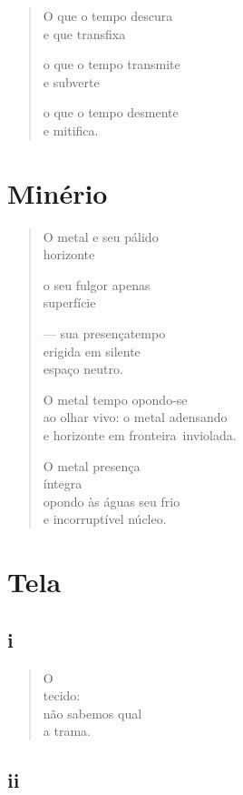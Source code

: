 \begin{verse}
O que o tempo descura\\
e que transfixa

o que o tempo transmite\\
e subverte

o que o tempo desmente\\
e mitifica.
\end{verse}

\chapter{Minério}

\begin{verse}
O metal e seu pálido\\
\hfill{}horizonte

o seu fulgor apenas\\
\hfill{}superfície

--- sua presençatempo\\
\quad{}erigida em silente\\
\quad{}espaço neutro.

O metal tempo opondo-se\\
ao olhar vivo: o metal adensando\\
e horizonte em fronteira\
\hfill{}inviolada.

O metal presença\\
\hfill{}íntegra\\
opondo às águas seu frio\\
e incorruptível núcleo.
\end{verse}

\chapter{Tela}

\section{i}

\begin{verse}
O\\
tecido:\\
não sabemos qual\\
a trama.
\end{verse}

\medskip
\section{ii}


